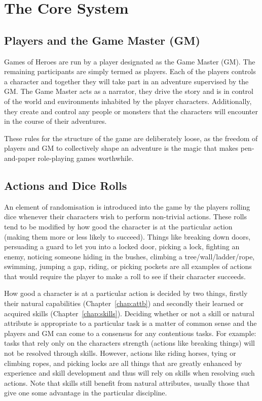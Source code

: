 \documentclass[a4paper,10pt,oneside]{book}
\begin{document}
\section{The Core System}
\label{sec:base}

\subsection{Players and the Game Master (GM)}
Games of Heroes are run by a player designated as the Game Master (GM). The remaining participants are simply termed as players. Each of the players controls a character and together they will take part in an adventure supervised by the GM. The Game Master acts as a narrator, they drive the story and is in control of the world and environments inhabited by the player characters. Additionally, they create and control any people or monsters that the characters will encounter in the course of their adventures. 

These rules for the structure of the game are deliberately loose, as the freedom of players and GM to collectively shape an adventure is the magic that makes pen-and-paper role-playing games worthwhile.

\subsection{Actions and Dice Rolls}
An element of randomisation is introduced into the game by the players rolling dice whenever their characters wish to perform non-trivial actions. These rolls tend to be modified by how good the character is at the particular action (making them more or less likely to succeed). Things like breaking down doors, persuading a guard to let you into a locked door, picking a lock, fighting an enemy, noticing someone hiding in the bushes, climbing a tree/wall/ladder/rope, swimming, jumping a gap, riding, or picking pockets are all examples of actions that would require the player to make a roll to see if their character succeeds. 

How good a character is at a particular action is decided by two things, firstly their natural capabilities (Chapter~\ref{chap:attb}) and secondly their learned or acquired skills (Chapter~\ref{chap:skills}). Deciding whether or not a skill or natural attribute is appropriate to a particular task is a matter of common sense and the players and GM can come to a consensus for any contentious tasks. For example: tasks that rely only on the characters strength (actions like breaking things) will not be resolved through skills. However, actions like riding horses, tying or climbing ropes, and picking locks are all things that are greatly enhanced by experience and skill development and thus will rely on skills when resolving such actions. Note that skills still benefit from natural attributes, usually those that give one some advantage in the particular discipline. 
\end{document}
